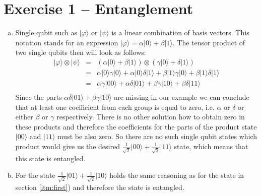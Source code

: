 \documentclass[a4paper,10pt]{article}
\newcommand{\qb}[1]{\ensuremath{\vert{#1}\rangle}}
\begin{document}
\section*{Exercise 1 -- Entanglement}
\begin{enumerate}[a)]
\item \label{itm:first} Single qubit such as \qb{\varphi} or \qb{\psi} is a linear combination of basis vectors. This notation stands for an expression $\qb{\varphi} = \alpha \qb{0} + \beta\qb{1}$. The tensor product of two single qubits then will look as follows:
\begin{eqnarray*}
\qb{\varphi} \otimes \qb{\psi} &=& \left( \alpha \qb{0} + \beta\qb{1} \right) \otimes \left( \gamma \qb{0} + \delta \qb{1} \right)\\
&=& \alpha \qb{0}\gamma \qb{0} + \alpha \qb{0}\delta\qb{1}  + \beta\qb{1}\gamma \qb{0} + \beta{\qb{1}}\delta \qb{1} \\
&=& \alpha\gamma\qb{00} + \alpha\delta\qb{01} + \beta\gamma\qb{10} + \beta\delta\qb{11}\\
\end{eqnarray*}
Since the parts $\alpha\delta\qb{01} + \beta\gamma\qb{10}$ are missing in our example we can conclude that at least one coefficient from each group is equal to zero, i.e. $\alpha$ or $\delta$ or either $\beta$ or $\gamma$ respectively. There is no other solution how to obtain zero in these products and therefore the coefficients for the parts of the product state \qb{00} and \qb{11} must be also zero. So there are no such single qubit states which product would give us the desired $\frac{1}{\sqrt{2}}\qb{00} + \frac{1}{\sqrt{2}}\qb{11}$ state, which means that this state is entangled.

\item For the state $\frac{1}{\sqrt{2}}\qb{01} + \frac{1}{\sqrt{2}}\qb{10}$ holds the same reasoning as for the state in section \ref{itm:first}) and therefore the state is entangled.


\end{enumerate}
\end{document}

